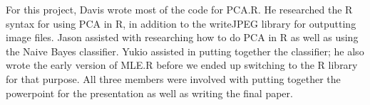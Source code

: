 \documentclass{article}
\begin{document}
For this project, Davis wrote most of the code for PCA.R. He researched the R syntax for using PCA in R, in addition to the writeJPEG library for outputting image files. Jason assisted with researching how to do PCA in R as well as using the Naive Bayes classifier. Yukio assisted in putting together the classifier; he also wrote the early version of MLE.R before we ended up switching to the R library for that purpose. All three members were involved with putting together the powerpoint for the presentation as well as writing the final paper.
\end{document}
